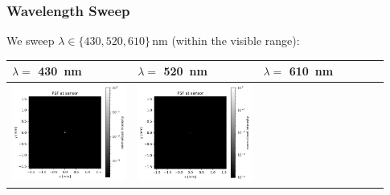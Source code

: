\documentclass[11pt,a4paper]{article}
\begin{document}
	\subsubsection*{Wavelength Sweep}\label{wavelength-sweep}
	
	We sweep \(\lambda \in \{430, 520, 610\}\,\mathrm{nm}\) (within the visible range):
	
	\begin{table}[H]
		\centering
		\begin{tabular}{>{\centering\arraybackslash}m{0.31\linewidth} >{\centering\arraybackslash}m{0.31\linewidth} >{\centering\arraybackslash}m{0.31\linewidth}}
			\toprule
			\(\lambda=\) \SI{430}{nm} & \(\lambda=\) \SI{520}{nm} & \(\lambda=\) \SI{610}{nm} \\
			\midrule
			\includegraphics[width=\linewidth,keepaspectratio]{sweep_lambda/biconvex_psf_430_log.png} &
			\includegraphics[width=\linewidth,keepaspectratio]{sweep_lambda/biconvex_psf_520_log.png} &

\end{tabular}
\end{table}
\end{document}
